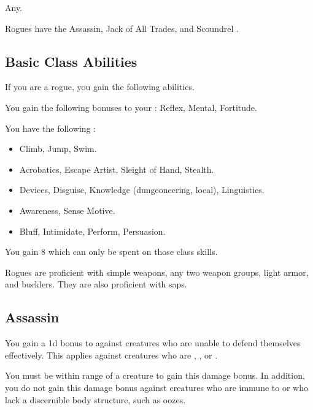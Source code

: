      Any.

     Rogues have the Assassin, Jack of All Trades, and Scoundrel .

    \subsection{Basic Class Abilities}
        If you are a rogue, you gain the following abilities.

        You gain the following bonuses to your :  Reflex,  Mental,  Fortitude.

        You have the following :
        \begin{itemize}
            \item {} Climb, Jump, Swim.
            \item {} Acrobatics, Escape Artist, Sleight of Hand, Stealth.
            \item {} Devices, Disguise, Knowledge (dungeoneering, local), Linguistics.
            \item {} Awareness, Sense Motive.
            \item {} Bluff, Intimidate, Perform, Persuasion.
        \end{itemize}
        You gain 8  which can only be spent on those class skills.

        Rogues are proficient with simple weapons, any two weapon groups, light armor, and bucklers.
        They are also proficient with saps.

    \subsection{Assassin}
         You gain a \plus1d bonus to  against creatures who are unable to defend themselves effectively.
        This applies against creatures who are \unaware, , or .

        You must be within \rngclose range of a creature to gain this damage bonus.
        In addition, you do not gain this damage bonus against creatures who are immune to  or who lack a discernible body structure, such as oozes.


